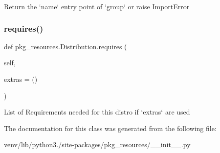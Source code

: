 \begin{DoxyVerb}Return the `name` entry point of `group` or raise ImportError\end{DoxyVerb}
 \mbox{\label{classpkg__resources_1_1_distribution_ab33ded1c619d6d4cdbe69607d042daee}} 
\subsubsection{\texorpdfstring{requires()}{requires()}}
{\footnotesize\ttfamily def pkg\+\_\+resources.\+Distribution.\+requires (\begin{DoxyParamCaption}\item[{}]{self,  }\item[{}]{extras = {\ttfamily ()} }\end{DoxyParamCaption})}

\begin{DoxyVerb}List of Requirements needed for this distro if `extras` are used\end{DoxyVerb}
 

The documentation for this class was generated from the following file\+:\begin{DoxyCompactItemize}
\item 
venv/lib/python3./site-\/packages/pkg\+\_\+resources/\+\_\+\+\_\+init\+\_\+\+\_\+.\+py\end{DoxyCompactItemize}

